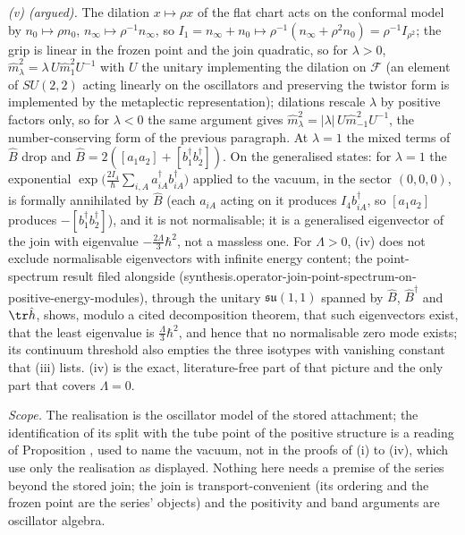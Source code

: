 \emph{(v) (argued).} The dilation $x \mapsto \rho x$ of the flat chart acts on the conformal model by $n_{0} \mapsto \rho n_{0}$, $n_{\infty} \mapsto \rho^{-1}n_{\infty}$, so $I_{1} = n_{\infty} + n_{0} \mapsto \rho^{-1}(n_{\infty} + \rho^{2}n_{0}) = \rho^{-1}I_{\rho^{2}}$; the grip is linear in the frozen point and the join quadratic, so for $\lambda > 0$, $\hat{m}^{2}_{\lambda} = \lambda\,U\hat{m}^{2}_{1}U^{-1}$ with $U$ the unitary implementing the dilation on $\mathcal{F}$ (an element of $SU(2,2)$ acting linearly on the oscillators and preserving the twistor form is implemented by the metaplectic representation); dilations rescale $\lambda$ by positive factors only, so for $\lambda < 0$ the same argument gives $\hat{m}^{2}_{\lambda} = |\lambda|\,U\hat{m}^{2}_{-1}U^{-1}$, the number-conserving form of the previous paragraph. At $\lambda = 1$ the mixed terms of $\hat{B}$ drop and $\hat{B} = 2([a_{1}a_{2}] + [b^{\dagger}_{1}b^{\dagger}_{2}])$. On the generalised states: for $\lambda = 1$ the exponential $\exp\bigl(\tfrac{2I_{4}}{\hbar}\sum_{i,A}a^{\dagger}_{iA}b^{\dagger}_{iA}\bigr)$ applied to the vacuum, in the sector $(0, 0, 0)$, is formally annihilated by $\hat{B}$ (each $a_{iA}$ acting on it produces $I_{4}b^{\dagger}_{iA}$, so $[a_{1}a_{2}]$ produces $-[b^{\dagger}_{1}b^{\dagger}_{2}]$), and it is not normalisable; it is a generalised eigenvector of the join with eigenvalue $-\tfrac{2\Lambda}{3}\hbar^{2}$, not a massless one. For $\Lambda > 0$, (iv) does not exclude normalisable eigenvectors with infinite energy content; the point-spectrum result filed alongside (synthesis.operator-join-point-spectrum-on-positive-energy-modules), through the unitary $\mathfrak{su}(1,1)$ spanned by $\hat{B}$, $\hat{B}^{\dagger}$ and $\tr\hat{h}$, shows, modulo a cited decomposition theorem, that such eigenvectors exist, that the least eigenvalue is $\tfrac{\Lambda}{3}\hbar^{2}$, and hence that no normalisable zero mode exists; its continuum threshold also empties the three isotypes with vanishing constant that (iii) lists. (iv) is the exact, literature-free part of that picture and the only part that covers $\Lambda = 0$.

\emph{Scope.} The realisation is the oscillator model of the stored attachment; the identification of its split with the tube point of the positive structure is a reading of Proposition , used to name the vacuum, not in the proofs of (i) to (iv), which use only the realisation as displayed. Nothing here needs a premise of the series beyond the stored join; the join is transport-convenient (its ordering and the frozen point are the series' objects) and the positivity and band arguments are oscillator algebra.
